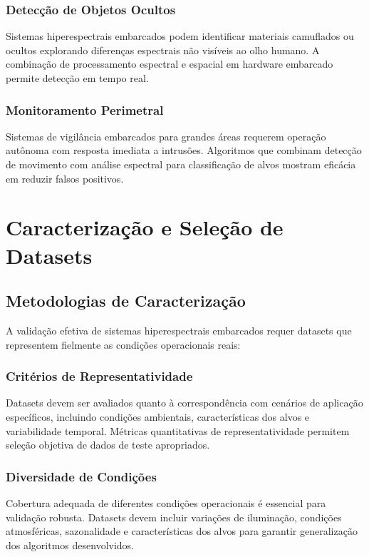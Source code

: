 \subsubsection{Detecção de Objetos Ocultos}
Sistemas hiperespectrais embarcados podem identificar materiais camuflados ou ocultos explorando diferenças espectrais não visíveis ao olho humano. A combinação de processamento espectral e espacial em hardware embarcado permite detecção em tempo real.

\subsubsection{Monitoramento Perimetral}
Sistemas de vigilância embarcados para grandes áreas requerem operação autônoma com resposta imediata a intrusões. Algoritmos que combinam detecção de movimento com análise espectral para classificação de alvos mostram eficácia em reduzir falsos positivos.

\section{Caracterização e Seleção de Datasets}\label{sec:datasets}

\subsection{Metodologias de Caracterização}
A validação efetiva de sistemas hiperespectrais embarcados requer datasets que representem fielmente as condições operacionais reais:

\subsubsection{Critérios de Representatividade}
Datasets devem ser avaliados quanto à correspondência com cenários de aplicação específicos, incluindo condições ambientais, características dos alvos e variabilidade temporal. Métricas quantitativas de representatividade permitem seleção objetiva de dados de teste apropriados.

\subsubsection{Diversidade de Condições}
Cobertura adequada de diferentes condições operacionais é essencial para validação robusta. Datasets devem incluir variações de iluminação, condições atmosféricas, sazonalidade e características dos alvos para garantir generalização dos algoritmos desenvolvidos.

